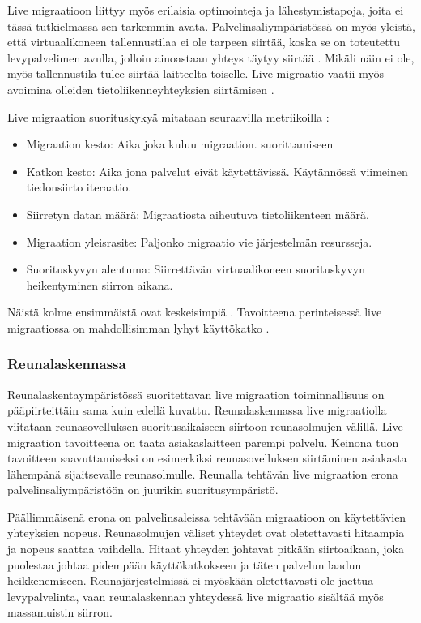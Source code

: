 Live migraatioon liittyy myös erilaisia optimointeja ja lähestymistapoja, joita ei tässä tutkielmassa sen tarkemmin avata. 
Palvelinsaliympäristössä on myös yleistä, että virtuaalikoneen tallennustilaa ei ole tarpeen siirtää, koska se on toteutettu levypalvelimen avulla, jolloin ainoastaan yhteys täytyy siirtää \cite{clark2005live}. Mikäli näin ei ole, myös tallennustila tulee siirtää laitteelta toiselle.
Live migraatio vaatii myös avoimina olleiden tietoliikenneyhteyksien siirtämisen \cite{clark2005live}.

Live migraation suorituskykyä mitataan seuraavilla metriikoilla \cite{soni2013comparative}:

\begin{itemize}
	\item Migraation kesto: Aika joka kuluu migraation. suorittamiseen
	\item Katkon kesto: Aika jona palvelut eivät käytettävissä. Käytännössä viimeinen tiedonsiirto iteraatio.
	\item Siirretyn datan määrä: Migraatiosta aiheutuva tietoliikenteen määrä.
	\item Migraation yleisrasite: Paljonko migraatio vie järjestelmän resursseja.
	\item Suorituskyvyn alentuma: Siirrettävän virtuaalikoneen suorituskyvyn heikentyminen siirron aikana.
\end{itemize}

Näistä kolme ensimmäistä ovat keskeisimpiä \cite{farris2017lightweight}. Tavoitteena perinteisessä live migraatiossa on mahdollisimman lyhyt käyttökatko \cite{ha2015adaptive}.

\subsubsection*{Reunalaskennassa}
Reunalaskentaympäristössä suoritettavan live migraation toiminnallisuus on pääpiirteittäin sama kuin edellä kuvattu.
Reunalaskennassa live migraatiolla viitataan reunasovelluksen suoritusaikaiseen siirtoon reunasolmujen välillä.
Live migraation tavoitteena on taata asiakaslaitteen parempi palvelu.
Keinona tuon tavoitteen saavuttamiseksi on esimerkiksi reunasovelluksen siirtäminen asiakasta lähempänä sijaitsevalle reunasolmulle. Reunalla tehtävän live migraation erona palvelinsaliympäristöön on juurikin suoritusympäristö. 

Päällimmäisenä erona on palvelinsaleissa tehtävään migraatioon on käytettävien yhteyksien nopeus. Reunasolmujen väliset yhteydet ovat oletettavasti hitaampia ja nopeus saattaa vaihdella\cite{ha2017you}.
Hitaat yhteyden johtavat pitkään siirtoaikaan, joka puolestaa johtaa pidempään käyttökatkokseen ja täten palvelun laadun heikkenemiseen. 
Reunajärjestelmissä ei myöskään oletettavasti ole jaettua levypalvelinta, vaan reunalaskennan yhteydessä live migraatio sisältää myös massamuistin siirron.

